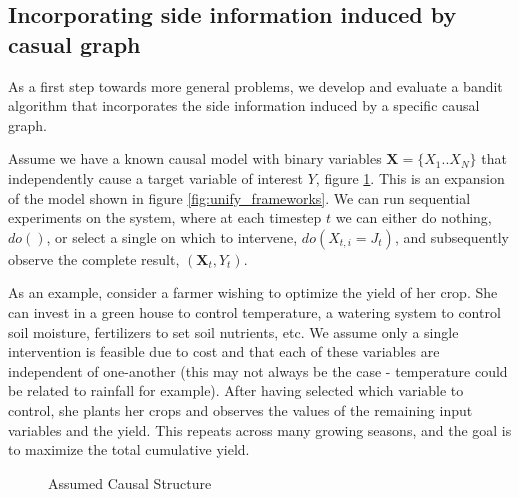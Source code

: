 \documentclass[11pt,a4paper]{article}
\begin{document}
\subsection{Incorporating side information induced by casual graph}

As a first step towards more general problems, we develop and evaluate a bandit algorithm that incorporates the side information induced by a specific causal graph. 

Assume we have a known causal model with binary variables $\boldsymbol{X} = \{X_{1}..X_{N}\}$ that independently cause a target variable of interest $Y$, figure \ref{fig:causalStructure}. This is an expansion of the model shown in figure \ref{fig:unify_frameworks}. We can run sequential experiments on the system, where at each timestep $t$ we can either do nothing, $do()$, or select a single on which to intervene, $do(X_{t,i} = J_t)$, and subsequently observe the complete result, $(\boldsymbol{X}_{t},Y_{t})$. 

As an example, consider a farmer wishing to optimize the yield of her crop. She can invest in a green house to control temperature, a watering system to control soil moisture, fertilizers to set soil nutrients, etc. We assume only a single intervention is feasible due to cost and that each of these variables are independent of one-another (this may not always be the case - temperature could be related to rainfall for example). After having selected which variable to control, she plants her crops and observes the values of the remaining input variables and the yield. This repeats across many growing seasons, and the goal is to maximize the total cumulative yield.

\begin{figure}[h]
\centering
\caption{Assumed Causal Structure}
\label{fig:causalStructure}
\end{figure}
\end{document}

